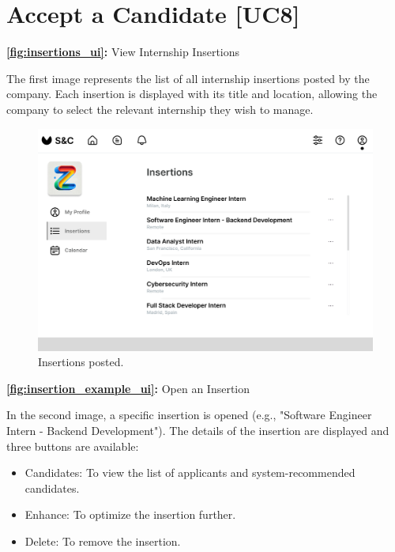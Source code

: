 \newpage

\section{Accept a Candidate [UC8]}
\label{sec:UI5_accept_candidate}

\textbf{\autoref{fig:insertions_ui}:} View Internship Insertions

The first image represents the list of all internship insertions posted by the company. Each insertion is displayed with its title and location, allowing the company to select the relevant internship they wish to manage.

\begin{figure}[H]
    \centering
    \includegraphics[width=0.75\linewidth]{DD/Images/UI/Insertions.png}
    \caption{Insertions posted.}
    \label{fig:insertions_ui}
\end{figure}

\newpage

\textbf{\autoref{fig:insertion_example_ui}:} Open an Insertion

In the second image, a specific insertion is opened (e.g., "Software Engineer Intern - Backend Development"). The details of the insertion are displayed and three buttons are available:

\begin{itemize}
    \item 
Candidates: To view the list of applicants and system-recommended candidates.
    \item 
Enhance: To optimize the insertion further.
    \item 
Delete: To remove the insertion.
\end{itemize}

